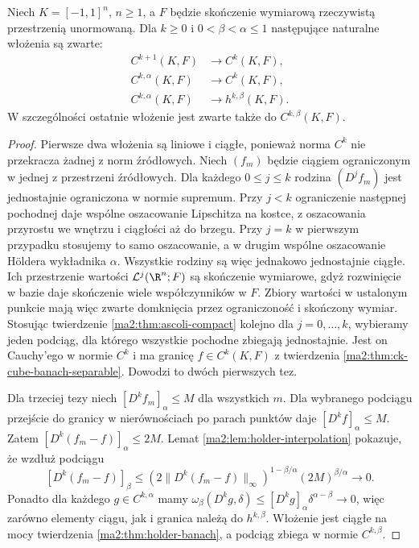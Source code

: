 \begin{twierdzenie}
\label{ma2:thm:compact-function-embeddings}
Niech $K=[-1,1]^n$, $n\ge1$, a $F$ będzie
skończenie wymiarową rzeczywistą przestrzenią
unormowaną. Dla $k\ge0$ i $0<\beta<\alpha\le1$
następujące naturalne włożenia są zwarte:
\[
 \begin{aligned}
 C^{k+1}(K,F)&\longrightarrow C^k(K,F),\\
 C^{k,\alpha}(K,F)&\longrightarrow C^k(K,F),\\
 C^{k,\alpha}(K,F)&\longrightarrow h^{k,\beta}(K,F).
 \end{aligned}
\]
W szczególności ostatnie włożenie jest zwarte
także do $C^{k,\beta}(K,F)$.
\end{twierdzenie}
\begin{proof}
Pierwsze dwa włożenia są liniowe i ciągłe,
ponieważ norma $C^k$ nie przekracza żadnej
z norm źródłowych. Niech $(f_m)$ będzie
ciągiem ograniczonym w jednej z przestrzeni
źródłowych. Dla każdego
$0\le j\le k$ rodzina $(D^jf_m)$ jest
jednostajnie ograniczona w normie supremum.
Przy $j<k$ ograniczenie następnej pochodnej
daje wspólne oszacowanie Lipschitza na
kostce, z oszacowania przyrostu we wnętrzu
i ciągłości aż do brzegu. Przy $j=k$
w pierwszym przypadku stosujemy to samo
oszacowanie, a w drugim wspólne oszacowanie
H\"oldera wykładnika $\alpha$.
Wszystkie rodziny są więc jednakowo
jednostajnie ciągłe. Ich przestrzenie
wartości $\mathcal L^j(\R^n;F)$ są skończenie
wymiarowe, gdyż rozwinięcie w bazie daje
skończenie wiele współczynników w $F$.
Zbiory wartości w ustalonym punkcie mają
więc zwarte domknięcia przez ograniczoność
i skończony wymiar. Stosując twierdzenie \ref{ma2:thm:ascoli-compact}
kolejno dla $j=0,\ldots,k$, wybieramy jeden
podciąg, dla którego wszystkie pochodne
zbiegają jednostajnie. Jest on Cauchy'ego
w normie $C^k$ i ma granicę $f\in C^k(K,F)$
z twierdzenia \ref{ma2:thm:ck-cube-banach-separable}.
Dowodzi to dwóch pierwszych tez.

Dla trzeciej tezy niech
$[D^kf_m]_\alpha\le M$ dla wszystkich $m$.
Dla wybranego podciągu przejście do granicy
w nierównościach po parach punktów daje
$[D^kf]_\alpha\le M$.
Zatem $[D^k(f_m-f)]_\alpha\le2M$.
Lemat \ref{ma2:lem:holder-interpolation}
pokazuje, że wzdłuż podciągu
\[
 [D^k(f_m-f)]_\beta
 \le (2\|D^k(f_m-f)\|_\infty)^{1-\beta/\alpha}
                   (2M)^{\beta/\alpha}\to0.
\]
Ponadto dla każdego $g\in C^{k,\alpha}$
mamy $\omega_\beta(D^kg,\delta)
\le [D^kg]_\alpha\delta^{\alpha-\beta}\to0$,
więc zarówno elementy ciągu, jak i granica
należą do $h^{k,\beta}$. Włożenie jest
ciągłe na mocy twierdzenia
\ref{ma2:thm:holder-banach}, a podciąg
zbiega w normie $C^{k,\beta}$.
\end{proof}

